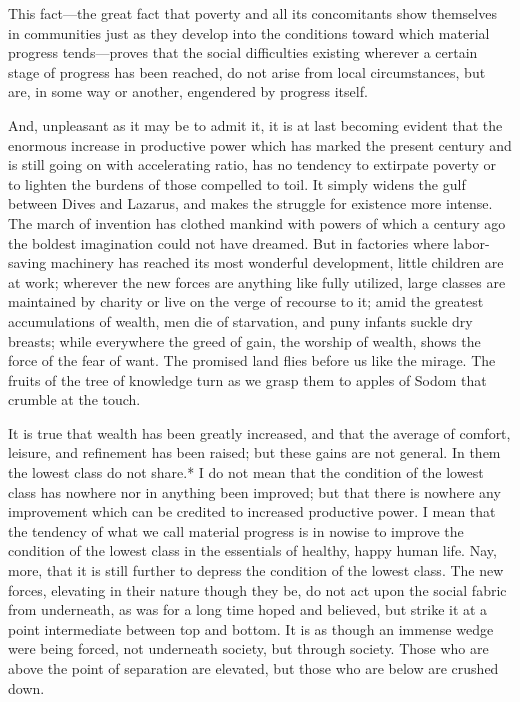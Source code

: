 This fact---the great fact that poverty and all its concomitants show
themselves in communities just as they develop into the conditions
toward which material progress tends---proves that the social
difficulties existing wherever a certain stage of progress has been
reached, do not arise from local circumstances, but are, in some way or
another, engendered by progress itself.

And, unpleasant as it may be to admit it, it is at last becoming evident
that the enormous increase in productive power which has marked the
present century and is still going on with accelerating ratio, has no
tendency to extirpate poverty or to lighten the burdens of those
compelled to toil. It simply widens the gulf between Dives and Lazarus,
and makes the struggle for existence more intense. The march of
invention has clothed mankind with powers of which a century ago the
boldest imagination could not have dreamed. But in factories where
labor-saving machinery has reached its most wonderful development,
little children are at work; wherever the new forces are anything like
fully utilized, large classes are maintained by charity or live on the
verge of recourse to it; amid the greatest accumulations of wealth, men
die of starvation, and puny infants suckle dry breasts; while everywhere
the greed of gain, the worship of wealth, shows the force of the fear of
want. The promised land flies before us like the mirage. The fruits of
the tree of knowledge turn as we grasp them to apples of Sodom that
crumble at the touch.

It is true that wealth has been greatly increased, and that the average
of comfort, leisure, and refinement has been raised; but these gains are
not general. In them the lowest class do not share.* I do not mean that
the condition of the lowest class has nowhere nor in anything been
improved; but that there is nowhere any improvement which can be
credited to increased productive power. I mean that the tendency of what
we call material progress is in nowise to improve the condition of the
lowest class in the essentials of healthy, happy human life. Nay, more,
that it is still further to depress the condition of the lowest class.
The new forces, elevating in their nature though they be, do not act
upon the social fabric from underneath, as was for a long time hoped and
believed, but strike it at a point intermediate between top and bottom.
It is as though an immense wedge were being forced, not underneath
society, but through society. Those who are above the point of
separation are elevated, but those who are below are crushed down.


